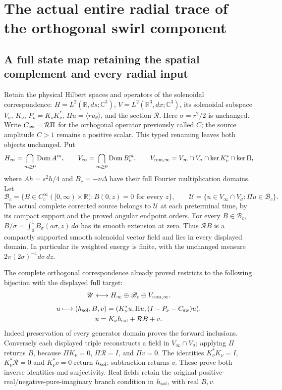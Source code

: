 \section*{The actual entire radial trace of the orthogonal swirl component}

\subsection*{A full state map retaining the spatial complement and every radial input}

Retain the physical Hilbert spaces and operators of the solenoidal
correspondence: \(H=L^2(\mathbb R,ds;\mathbb C^3)\),
\(V=L^2(\mathbb R^3,dx;\mathbb C^3)\), its solenoidal subspace
\(V_\sigma\), \(K_\nu\), \(P_\nu=K_\nu K_\nu^*\),
\(\Pi u=\langle r u_\theta\rangle\), and the section \(\mathcal R\).
Here \(\sigma=r^2/2\) is unchanged. Write
\(C_{\rm sw}=\mathcal R\Pi\) for the orthogonal operator previously
called \(C\); the source amplitude \(C>1\) remains a positive scalar.
This typed renaming leaves both objects unchanged. Put
\[
 H_\infty=\bigcap_{m\geq0}\operatorname{Dom} A^m,
 \qquad V_\infty=\bigcap_{m\geq0}\operatorname{Dom}B_\nu^m,
 \qquad V_{{\rm rem},\infty}
 =V_\infty\cap V_\sigma\cap\ker K_\nu^*\cap\ker\Pi,
\]
where \(Ah=s^2h/4\) and \(B_\nu=-\nu\Delta\) have their full
Fourier multiplication domains. Let
\[
 \mathscr B_c=\{B\in C_c^\infty([0,\infty)\times\mathbb R):
                                      B(0,z)=0\text{ for every }z\},
 \qquad
 \mathscr U=\{u\in V_\infty\cap V_\sigma:\Pi u\in\mathscr B_c\}.
\]
The actual complete corrected source belongs to \(\mathscr U\) at each
preterminal time, by its compact support and the proved angular endpoint
orders. For every \(B\in\mathscr B_c\),
\(B/\sigma=\int_0^1B_\sigma(a\sigma,z)\,da\) has its smooth
extension at zero. Thus \(\mathcal RB\) is a compactly supported
smooth solenoidal vector field and lies in every displayed domain.
In particular its weighted energy is finite, with the unchanged measure
\(2\pi(2\sigma)^{-1}d\sigma\,dz\).

The complete orthogonal correspondence already proved restricts to the
following bijection with the displayed full target:
\[
 \mathscr U\longleftrightarrow
 H_\infty\oplus\mathscr B_c\oplus V_{{\rm rem},\infty}.
\]
\[
 \begin{gathered}
 u\longmapsto(h_{\rm sol},B,v)
   =(K_\nu^*u,\Pi u,(I-P_\nu-C_{\rm sw})u),\\
 u=K_\nu h_{\rm sol}+\mathcal RB+v.
 \end{gathered}
\]
Indeed preservation of every generator domain proves the forward
inclusions. Conversely each displayed triple reconstructs a field in
\(V_\infty\cap V_\sigma\); applying \(\Pi\) returns \(B\), because
\(\Pi K_\nu=0\), \(\Pi\mathcal R=I\), and \(\Pi v=0\).
The identities \(K_\nu^*K_\nu=I\), \(K_\nu^*\mathcal R=0\) and
\(K_\nu^*v=0\) return \(h_{\rm sol}\); subtraction returns \(v\).
These prove both inverse identities and surjectivity. Real fields retain
the original positive-real/negative-pure-imaginary branch condition in
\(h_{\rm sol}\), with real \(B,v\).

